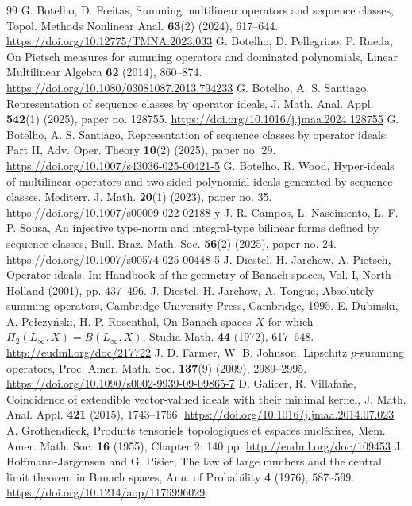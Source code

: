 \documentclass[12pt]{amsart}
\begin{document}
\begin{thebibliography}{99}
	 G. Botelho, D. Freitas, Summing multilinear operators and sequence classes, Topol. Methods Nonlinear Anal. \textbf{63}(2) (2024), 617--644. \url{https://doi.org/10.12775/TMNA.2023.033}
	 G. Botelho, D. Pellegrino, P. Rueda, On Pietsch measures for summing operators and dominated polynomials, Linear Multilinear Algebra \textbf{62} (2014), 860--874. \url{https://doi.org/10.1080/03081087.2013.794233}
	 G. Botelho, A. S. Santiago, Representation of sequence classes by operator ideals, J. Math. Anal. Appl. \textbf{542}(1) (2025), paper no. 128755. \url{https://doi.org/10.1016/j.jmaa.2024.128755}
	 G. Botelho, A. S. Santiago, Representation of sequence classes by operator ideals: Part II, Adv. Oper. Theory \textbf{10}(2) (2025), paper no. 29. \url{https://doi.org/10.1007/s43036-025-00421-5}
	 G. Botelho, R. Wood, Hyper-ideals of multilinear operators and two-sided polynomial ideals generated by sequence classes, Mediterr. J. Math. \textbf{20}(1) (2023), paper no. 35. \url{https://doi.org/10.1007/s00009-022-02188-y}
	 J. R. Campos, L. Nascimento, L. F. P. Sousa, An injective type-norm and integral-type bilinear forms defined by sequence classes, Bull. Braz. Math. Soc. \textbf{56}(2) (2025), paper no. 24. \url{https://doi.org/10.1007/s00574-025-00448-5}
	 J. Diestel, H. Jarchow, A. Pietsch, Operator ideals. In: Handbook of the geometry of Banach spaces, Vol. I, North-Holland (2001), pp. 437--496.
	 J. Diestel, H. Jarchow, A. Tongue, Absolutely summing operators, Cambridge University Press, Cambridge, 1995.
	 E. Dubinski, A. Pe{\l}czy{\'n}ski, H. P. Rosenthal, On Banach spaces $X$ for which $\Pi_2(L_\infty,X) = B(L_\infty,X)$, Studia Math. \textbf{44} (1972), 617--648. \url{http://eudml.org/doc/217722}
	 J. D. Farmer, W. B. Johnson, Lipschitz $p$-summing operators, Proc. Amer. Math. Soc. \textbf{137}(9) (2009), 2989--2995. \url{https://doi.org/10.1090/s0002-9939-09-09865-7}
	 D. Galicer, R. Villafañe, Coincidence of extendible vector-valued ideals with their minimal kernel, J. Math. Anal. Appl. \textbf{421} (2015), 1743--1766. \url{https://doi.org/10.1016/j.jmaa.2014.07.023}
	 A. Grothendieck, Produits tensoriels topologiques et espaces nucléaires, Mem. Amer. Math. Soc. \textbf{16} (1955), Chapter 2: 140 pp. \url{http://eudml.org/doc/109453}
	 J. Hoffmann-J{\o}rgensen and G. Pisier, The law of large numbers and the central limit theorem in Banach spaces, Ann. of Probability \textbf{4} (1976), 587--599. \url{https://doi.org/10.1214/aop/1176996029}

\end{thebibliography}
\end{document}
